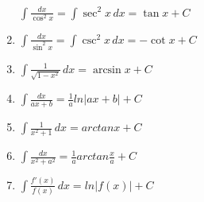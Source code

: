 \begin{center}
\begin{small}
\begin{enumerate}
\begin{math}
                \int \frac{dx}{\cos^2 x}=\int \sec^2 x \, dx = \tan x + C
            \end{math}
            \item \begin{math}
                \int \frac{dx}{\sin^2 x}=\int \csc^2 x \, dx = -\cot x + C
            \end{math}
            \item \begin{math}
                \int {\frac{1}{\sqrt{1-x^2}}} \, dx = \arcsin {x} + C
            \end{math}
            \item \begin{math}
                \int \frac{dx}{ax + b} = \frac{1}{a} ln |ax + b| + C
            \end{math}
            \item \begin{math}
                \int \frac{1}{x^2 + 1} \, dx = arctan x + C
            \end{math}
            \item \begin{math}
                \int \frac{dx}{x^2 + a^2} = \frac{1}{a} arctan \frac{x}{a} + C
            \end{math}
            \item \begin{math}
                \int \frac{f'(x)}{f(x)} \, dx = ln|f(x)| + C
            \end{math}
        \end{enumerate}
    \end{small}
\end{center}

